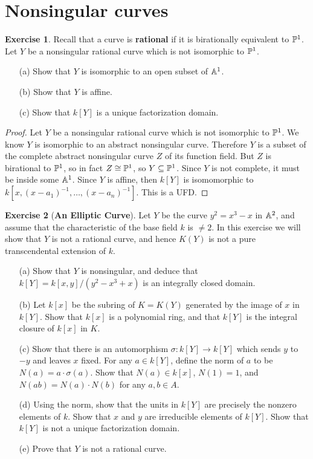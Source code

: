 \documentclass[11pt]{book}
\theoremstyle{definition}
\newtheorem{exercise}{Exercise}[section]
\begin{document}
\section{Nonsingular curves}
\begin{exercise}\label{nonsingular rational curve not P^1 prop}
Recall that a curve is \textbf{rational} if it is birationally equivalent to $\P^1$. Let $Y$ be a nonsingular rational curve which is not isomorphic to $\P^1$.
\begin{itemize}
\item[(a)] Show that $Y$ is isomorphic to an open subset of $\A^1$.
\item[(b)] Show that $Y$ is affine.
\item[(c)] Show that $k[Y]$ is a unique factorization domain.
\end{itemize}
\end{exercise}
\begin{proof}
Let $Y$ be a nonsingular rational curve which is not isomorphic to $\P^1$. We know $Y$ is isomorphic to an abstract nonsingular curve. Therefore $Y$ is a subset of the complete abstract nonsingular curve $Z$ of its function field. But $Z$ is birational to $\P^1$, so in fact $Z\cong\P^1$, so $Y\sub\P^1$. Since $Y$ is not complete, it must be inside some $\A^1$. Since $Y$ is affine, then $k[Y]$ is isomomorphic to $k[x,(x-a_1)^{-1},\dots,(x-a_n)^{-1}]$. This is a UFD.
\end{proof}
\begin{exercise}[\textbf{An Elliptic Curve}]
Let $Y$ be the curve $y^2=x^3-x$ in $\A^2$, and assume that the characteristic of the base field $k$ is $\neq 2$. In this exercise we will show that $Y$ is not a rational curve, and hence $K(Y)$ is not a pure transcendental extension of $k$.
\begin{itemize}
\item[(a)] Show that $Y$ is nonsingular, and deduce that $k[Y]=k[x,y]/(y^2-x^3+x)$ is an integrally closed domain.
\item[(b)] Let $k[x]$ be the subring of $K=K(Y)$ generated by the image of $x$ in $k[Y]$. Show that $k[x]$ is a polynomial ring, and that $k[Y]$ is the integral closure of $k[x]$ in $K$.
\item[(c)] Show that there is an automorphism $\sigma:k[Y]\to k[Y]$ which sends $y$ to $-y$ and leaves $x$ fixed. For any $a\in k[Y]$, define the norm of $a$ to be $N(a)=a\cdot\sigma(a)$. Show that $N(a)\in k[x]$, $N(1)=1$, and $N(ab)=N(a)\cdot N(b)$ for any $a,b\in A$.
\item[(d)] Using the norm, show that the units in $k[Y]$ are precisely the nonzero elements of $k$. Show that $x$ and $y$ are irreducible elements of $k[Y]$. Show that $k[Y]$ is not a unique factorization domain.
\item[(e)] Prove that $Y$ is not a rational curve.
\end{itemize}
\end{exercise}
\end{document}
